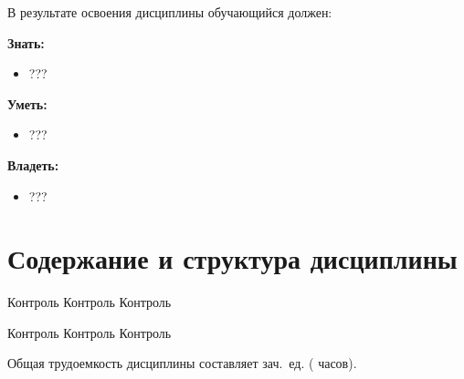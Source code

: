 В результате освоения дисциплины обучающийся должен:

\textbf{Знать:}
	\begin{itemize}
		\item ???
	\end{itemize}

\textbf{Уметь:}
	\begin{itemize}
		\item ???
	\end{itemize}

\textbf{Владеть:}
	\begin{itemize}
		\item ???
	\end{itemize}

\section{Содержание и структура дисциплины}
	

	{\lipsum[1-2]}
	{Контроль Контроль Контроль}

	{\lipsum[3-4]}
	{Контроль Контроль Контроль}

	 Общая трудоемкость дисциплины составляет
	 зач.~ед. ( часов).




